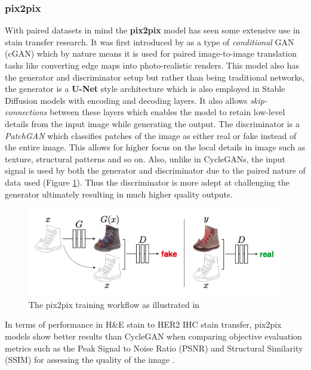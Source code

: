 \subsubsection{pix2pix}

With paired datasets in mind the \textbf{pix2pix} model has seen some extensive use in stain transfer research. It was first introduced by  \textcite{Isola2016Image-to-ImageNetworks} as a type of \textit{conditional} GAN (cGAN) which by nature means it is used for paired image-to-image translation tasks like converting edge maps into photo-realistic renders. This model also has the generator and discriminator setup but rather than being traditional networks, the generator is a \textbf{U-Net} style architecture which is also employed in Stable Diffusion models with encoding and decoding layers. It also allows \textit{skip-connections} between these layers which enables the model to retain low-level details from the input image while generating the output. The discriminator is a \textit{PatchGAN} which classifies patches of the image as either real or fake instead of the entire image. This allows for higher focus on the local details in image such as texture, structural patterns and so on. Also, unlike in CycleGANs, the input signal is used by both the generator and discriminator due to the paired nature of data used (Figure \ref{fig:pix2pix}). Thus the discriminator is more adept at challenging the generator ultimately resulting in much higher quality outputs.

\begin{figure}[h]
    \centering
    \includegraphics[width=1\linewidth]{2_LiteratureSurvey/figures/pix2pix.png}
    \caption[pix2pix workflow]{The pix2pix training workflow as illustrated in \parencite[Figure 2, p. 2]{Isola2016Image-to-ImageNetworks}}
    \label{fig:pix2pix}
\end{figure}
In terms of performance in H\&E stain to HER2 IHC stain transfer, pix2pix models show better results than CycleGAN when comparing objective evaluation metrics such as the Peak Signal to Noise Ratio (PSNR) and Structural Similarity (SSIM) for assessing the quality of the image \parencite[Table 1, p. 7]{Liu2022BCI:Pix2pix}.

